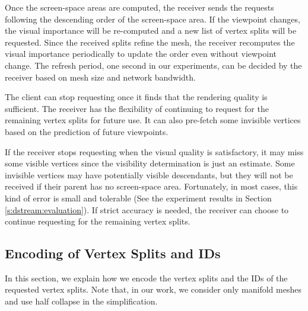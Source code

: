     Once the screen-space areas are computed, the receiver sends the requests 
	following the descending order of the 
    screen-space area. If the viewpoint changes, the visual importance will
    be re-computed and a new list of vertex splits will be requested. Since the received
    splits refine the mesh, the receiver recomputes the visual importance periodically
    to update the order even without viewpoint change. The refresh period, one second
    in our experiments, can be decided
    by the receiver based on mesh size and network bandwidth.

    The client can stop requesting once it finds that the rendering quality is sufficient.
    The receiver has the flexibility of continuing to request for the remaining vertex splits for future use.
    It can also pre-fetch some invisible vertices based on the prediction of future viewpoints.

    If the receiver stops requesting %
    when the visual quality is satisfactory, 
    it may miss some visible vertices since the visibility determination is just an estimate.
    Some invisible vertices may have potentially 
    visible descendants, but they will not be received if their parent has  
    no screen-space area. 
    Fortunately, in most cases, this kind of error is small and 
    tolerable (See the experiment results in Section \ref{s:dstream:evaluation}).
    If strict accuracy is needed, the receiver can choose to continue requesting 
    for the remaining vertex splits.  
    \subsection{Encoding of Vertex Splits and IDs}
    \label{ss:dstream:encoding}


	In this section, we explain how we encode the vertex splits 
	and the IDs of the requested vertex splits.  Note that, in 
	our work, we consider only manifold meshes and use half 
	collapse in the simplification.
    
